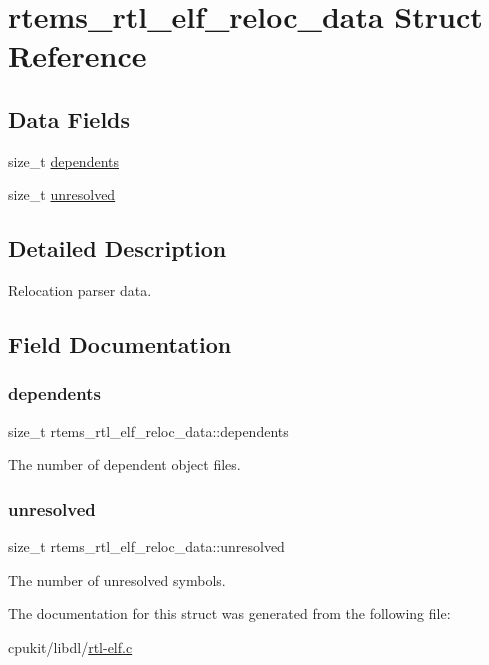 \hypertarget{structrtems__rtl__elf__reloc__data}{}\section{rtems\+\_\+rtl\+\_\+elf\+\_\+reloc\+\_\+data Struct Reference}
\label{structrtems__rtl__elf__reloc__data}
\subsection*{Data Fields}
\begin{DoxyCompactItemize}
\item 
size\+\_\+t \mbox{\hyperlink{structrtems__rtl__elf__reloc__data_a1936c58827d96aa879f9d2e999313937}{dependents}}
\item 
size\+\_\+t \mbox{\hyperlink{structrtems__rtl__elf__reloc__data_a15018dfd468e1523f8f39c3c085ec3dc}{unresolved}}
\end{DoxyCompactItemize}


\subsection{Detailed Description}
Relocation parser data. 

\subsection{Field Documentation}
\mbox{\label{structrtems__rtl__elf__reloc__data_a1936c58827d96aa879f9d2e999313937}} 
\subsubsection{\texorpdfstring{dependents}{dependents}}
{\footnotesize\ttfamily size\+\_\+t rtems\+\_\+rtl\+\_\+elf\+\_\+reloc\+\_\+data\+::dependents}

The number of dependent object files. \mbox{\label{structrtems__rtl__elf__reloc__data_a15018dfd468e1523f8f39c3c085ec3dc}} 
\subsubsection{\texorpdfstring{unresolved}{unresolved}}
{\footnotesize\ttfamily size\+\_\+t rtems\+\_\+rtl\+\_\+elf\+\_\+reloc\+\_\+data\+::unresolved}

The number of unresolved symbols. 

The documentation for this struct was generated from the following file\+:\begin{DoxyCompactItemize}
\item 
cpukit/libdl/\mbox{\hyperlink{rtl-elf_8c}{rtl-\/elf.\+c}}\end{DoxyCompactItemize}
